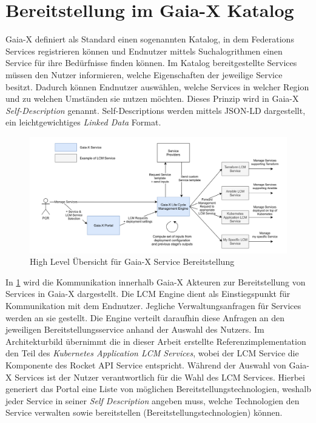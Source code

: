 \section{Bereitstellung im Gaia-X Katalog}
\label{sec:gaia-x-einbettung:gaia-x-katalog}
Gaia-X definiert als Standard einen sogenannten Katalog, in dem Federations Services registrieren können 
und Endnutzer mittels Suchalogrithmen einen Service für ihre Bedürfnisse finden können. 
Im Katalog bereitgestellte Services müssen den Nutzer informieren, welche Eigenschaften der jeweilige Service besitzt.
Dadurch können Endnutzer auswählen, welche Services in welcher Region und zu welchen Umständen sie nutzen möchten.
Dieses Prinzip wird in Gaia-X \emph{Self-Description} genannt. Self-Descriptions werden mittels JSON-LD dargestellt, ein
leichtgewichtiges \emph{Linked Data} Format.\cite{Eggers2020}

\begin{figure}
  \centering
  \includegraphics[width=\textwidth]{gfx/chapters/4_gaia-X/orchestration_overview.png}
  \caption{High Level Übersicht für Gaia-X Service Bereitstellung}
  \label{fig:gaia-x-orchestration-overview}
\end{figure}

In \ref{fig:gaia-x-orchestration-overview} wird die Kommunikation innerhalb Gaia-X Akteuren 
zur Bereitstellung von Services in Gaia-X dargestellt.  
Die \ac{LCM} Engine dient als Einstiegspunkt für Kommunikation mit dem Endnutzer. Jegliche Verwaltungsanfragen
für Services werden an sie gestellt. Die Engine verteilt daraufhin diese Anfragen 
an den jeweiligen Bereitstellungsservice anhand der Auswahl des Nutzers.
Im Architekturbild übernimmt die in dieser Arbeit erstellte Referenzimplementation 
den Teil des \emph{Kubernetes Application LCM Services}, wobei der \ac{LCM} Service die 
Komponente des Rocket API Service entspricht.
Während der Auswahl von Gaia-X Services ist der Nutzer verantwortlich für die Wahl des \ac{LCM} Services.
Hierbei generiert das Portal eine Liste von möglichen Bereitstellungstechnologien,
weshalb jeder Service in seiner \emph{Self Description} angeben muss, welche Technologien den Service
verwalten sowie bereitstellen (Bereitstellungstechnologien) können.

